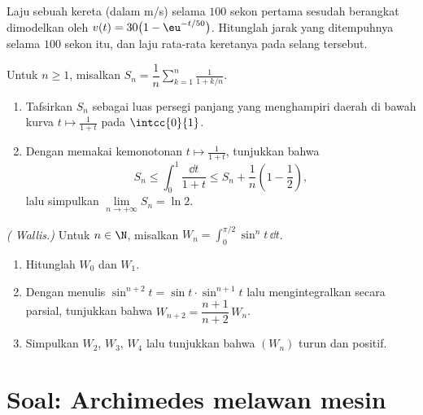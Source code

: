 \begin{exercise}[$\star\star$]\label{exo:g12:integ:7}
Laju sebuah kereta (dalam m/s) selama $100$ sekon pertama sesudah berangkat
dimodelkan oleh $v(t) = 30\bigl(1 - \eu^{-t/50}\bigr)$. Hitunglah jarak yang
ditempuhnya selama $100$ sekon itu, dan laju rata-rata keretanya pada
selang tersebut.
\end{exercise}

\begin{exercise}[$\star\star\star$]\label{exo:g12:integ:8}
Untuk $n \geq 1$, misalkan $S_n = \dfrac1n \displaystyle\sum_{k=1}^{n} \frac{1}{1 + k/n}$.
\begin{enumerate}
  \item Tafsirkan $S_n$ sebagai luas persegi panjang yang menghampiri daerah
        di bawah kurva $t \mapsto \frac{1}{1+t}$ pada $\intcc{0}{1}$.
  \item Dengan memakai kemonotonan $t \mapsto \frac{1}{1+t}$, tunjukkan bahwa
        \[
        S_n \leq \int_0^1 \frac{\dd t}{1+t} \leq S_n + \frac1n\left(1 - \frac12\right),
        \]
        lalu simpulkan $\lim\limits_{n\to+\infty} S_n = \ln 2$.
\end{enumerate}
\end{exercise}

\begin{exercise}[$\star\star\star$]\label{exo:g12:integ:9}
\emph{( Wallis.)} Untuk $n \in \N$, misalkan
$W_n = \displaystyle\int_0^{\pi/2} \sin^n t\,\dd t$.
\begin{enumerate}
  \item Hitunglah $W_0$ dan $W_1$.
  \item Dengan menulis $\sin^{n+2}t = \sin t \cdot \sin^{n+1} t$ lalu
        mengintegralkan secara parsial, tunjukkan bahwa $W_{n+2} = \dfrac{n+1}{n+2}\,W_n$.
  \item Simpulkan $W_2$, $W_3$, $W_4$ lalu tunjukkan bahwa $(W_n)$ turun dan
        positif.
\end{enumerate}
\end{exercise}

\section{Soal: Archimedes melawan mesin}


